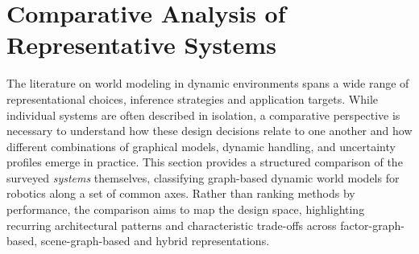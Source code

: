 \section{Comparative Analysis of Representative Systems}\label{sec:taxonomy}
The literature on world modeling in dynamic environments spans a wide range of representational choices, inference strategies and application targets.
While individual systems are often described in isolation, a comparative perspective is necessary to understand how these design decisions relate to one another and how different combinations of graphical models, dynamic handling, and uncertainty profiles emerge in practice. 
This section provides a structured comparison of the surveyed \emph{systems} themselves, classifying graph-based dynamic world models for robotics along a set of common axes.
Rather than ranking methods by performance, the comparison aims to map the design space, highlighting recurring architectural patterns and characteristic trade-offs across factor-graph-based, scene-graph-based and hybrid representations.

